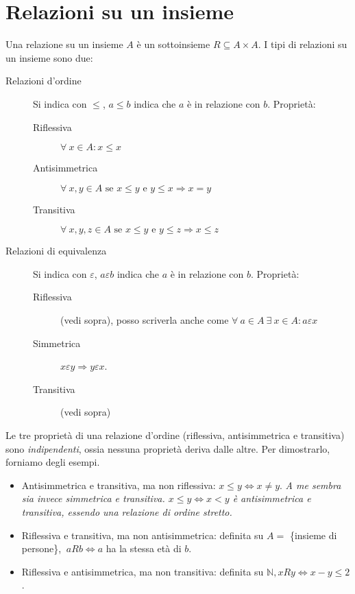 \section{Relazioni su un insieme}

Una relazione su un insieme $A$ \`e un sottoinsieme $R \subseteq A \times A$. I tipi di relazioni su un insieme sono due:

\begin{description}
    \item[Relazioni d'ordine] Si indica con $\le$, $a \leq b$ indica che $a$ \`e in relazione con $b$. Propriet\`a:
    \begin{description}
        \item [Riflessiva] $\forall \ x \in A : x \leq x$
        \item [Antisimmetrica] $\forall \ x, y \in A \text{ se } x \leq y \text{ e }  y \leq x \Rightarrow x = y$
        \item [Transitiva] $\forall \ x, y, z \in A \text{ se } x \leq y \text{ e } y \leq z \Rightarrow x \leq z$
    \end{description}
    \item[Relazioni di equivalenza] Si indica con $\varepsilon$, $a \varepsilon b$ indica che $a$ \`e in relazione con $b$. Propriet\`a:
    \begin{description}
      \item [Riflessiva] (vedi sopra), posso scriverla anche come $\forall \ a \in A \ \exists \ x \in A : a \varepsilon x$
      \item [Simmetrica] $x \varepsilon y \Rightarrow y \varepsilon x$.
      \item [Transitiva] (vedi sopra)
    \end{description}
\end{description}

Le tre propriet\`a di una relazione d'ordine (riflessiva, antisimmetrica e transitiva) sono \textit{indipendenti}, ossia nessuna propriet\`a deriva dalle altre. Per dimostrarlo, forniamo degli esempi.
\begin{itemize}
  \item Antisimmetrica e transitiva, ma non riflessiva: $x \le y \Leftrightarrow x \neq y$. \textit{A me sembra sia invece simmetrica e transitiva. $x \le y \Leftrightarrow x < y$ \`e antisimmetrica e transitiva, essendo una relazione di ordine stretto.}
  \item Riflessiva e transitiva, ma non antisimmetrica: definita su $A = $ \{insieme di persone\}, $ \ a R b \Leftrightarrow a$ ha la stessa et\`a di $b$.
  \item Riflessiva e antisimmetrica, ma non transitiva: definita su $\mathbb{N}, x R y \Leftrightarrow x - y \le 2$.
\end{itemize}

